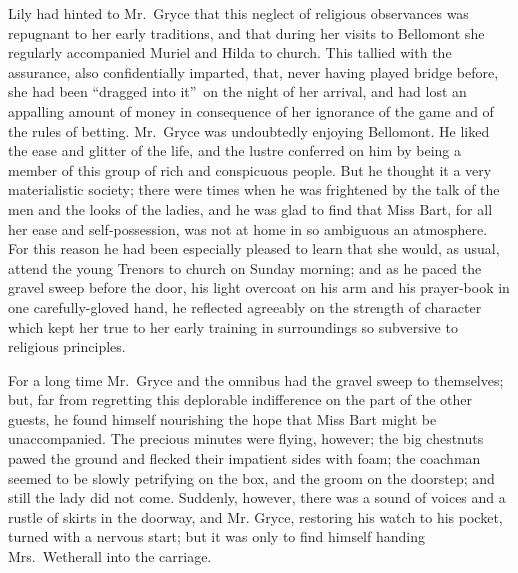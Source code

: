 \documentclass[12pt,a4paper]{book}
\begin{document}
Lily had hinted to Mr.\ Gryce that this neglect of religious
observances was repugnant to her early traditions, and that
during her visits to Bellomont she regularly accompanied Muriel
and Hilda to church. This tallied with the assurance, also
confidentially imparted, that, never having played bridge
before, she had been ``dragged into it''\ on the night of her
arrival, and had lost an appalling amount of money in
consequence of her ignorance of the game and of the rules of
betting. Mr.\ Gryce was undoubtedly enjoying Bellomont. He liked
the ease and glitter of the life, and the lustre conferred on him
by being a member of this group of rich and conspicuous people. 
But he thought it a very materialistic society; there were times
when he was frightened by the talk of the men and the looks of
the ladies, and he was glad to find that Miss Bart, for all her
ease and self-possession, was not at home in so ambiguous an
atmosphere. For this reason he had been especially pleased to
learn that she would, as usual, attend the young Trenors
to church on Sunday morning; and as he paced the gravel sweep
before the door, his light overcoat on his arm and his
prayer-book in one carefully-gloved hand, he reflected agreeably
on the strength of character which kept her true to her early
training in surroundings so subversive to religious principles.





For a long time Mr.\ Gryce and the omnibus had the gravel sweep to
themselves; but, far from regretting this deplorable indifference
on the part of the other guests, he found himself nourishing the
hope that Miss Bart might be unaccompanied. The precious minutes
were flying, however; the big chestnuts pawed the ground and
flecked their impatient sides with foam; the coachman seemed to
be slowly petrifying on the box, and the groom on the doorstep;
and still the lady did not come. Suddenly, however, there was a
sound of voices and a rustle of skirts in the doorway, and Mr.
Gryce, restoring his watch to his pocket, turned with a nervous
start; but it was only to find himself handing Mrs.\ Wetherall
into the carriage.
\end{document}
